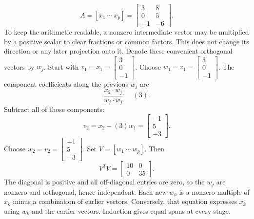 \[A=[x_1\ \cdots\ x_p]=\left[\begin{array}{rr}3&8\\0&5\\-1&-6\end{array}\right].\]
To keep the arithmetic readable, a nonzero intermediate vector may be multiplied by a positive scalar to clear fractions or common factors. This does not change its direction or any later projection onto it. Denote these convenient orthogonal vectors by $w_j$.
Start with $v_1=x_1=\left[\begin{array}{r}3\\0\\-1\end{array}\right]$.
Choose $w_{1}=v_{1}=\left[\begin{array}{r}3\\0\\-1\end{array}\right]$.
The component coefficients along the previous $w_j$ are
\[\frac{x_{2}\cdot w_j}{w_j\cdot w_j}:\quad(3).\]
Subtract all of those components:
\[v_{2}=x_{2}-(3)w_{1}=\left[\begin{array}{r}-1\\5\\-3\end{array}\right].\]
Choose $w_{2}=v_{2}=\left[\begin{array}{r}-1\\5\\-3\end{array}\right]$.
Set $V=[w_1\ \cdots\ w_p]$. Then
\[V^TV=\left[\begin{array}{rr}10&0\\0&35\end{array}\right].\]
The diagonal is positive and all off-diagonal entries are zero, so the $w_j$ are nonzero and orthogonal, hence independent. Each new $w_k$ is a nonzero multiple of $x_k$ minus a combination of earlier vectors. Conversely, that equation expresses $x_k$ using $w_k$ and the earlier vectors. Induction gives equal spans at every stage.

